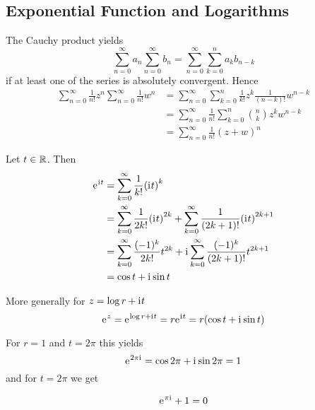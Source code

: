 \subsection{Exponential Function and Logarithms}

\begin{exercise}
The Cauchy product yields
\[
	\sum_{n=0}^\infty a_n \sum_{n=0}^\infty b_n = \sum_{n=0}^\infty \sum_{k=0}^n a_k b_{n-k}
\]  
if at least one of the series is absolutely convergent. Hence
\[
    \begin{split}
		\sum_{n=0}^\infty \frac{1}{n!} z^n \sum_{n=0}^\infty \frac{1}{n!} w^n 
			& = \sum_{n=0}^{\infty} \sum_{k=0}^{n} \frac{1}{k!} z^{k} \frac{1}{(n - k)!} w^{n - k} \\
			& = \sum_{n=0}^{\infty} \frac{1}{n!} \sum_{k=0}^{n} \binom{n}{k} z^{k}w^{n - k} \\
			& = \sum_{n=0}^\infty \frac{1}{n!} {(z + w)}^n	
    \end{split}
\]  
\end{exercise}
\bigskip


Let \( t \in \mathbb{R} \). Then
\[
    \begin{split}
		\mathrm{e}\mkern1mu^{\mathrm{i}\mkern1mu t}
			& = \sum_{k=0}^\infty \frac{1}{k!} {(\mathrm{i}\mkern1mu t)}^k \\
			& = \sum_{k=0}^\infty \frac{1}{2k!} {(\mathrm{i}\mkern1mu t)}^{2k} + 
				\sum_{k=0}^\infty \frac{1}{(2k + 1)!} {(\mathrm{i}\mkern1mu t)}^{2k + 1} \\
			& = \sum_{k=0}^\infty \frac{(-1)^k}{2k!} t^{2k} + 
				\mathrm{i}\mkern1mu\sum_{k=0}^\infty \frac{(-1)^k}{(2k + 1)!} t^{2k + 1} \\
			& = \cos{t} + \mathrm{i}\mkern1mu\sin{t}
    \end{split}
\]

More generally for \( z = \log r + \mathrm{i}\mkern1mu t\)
\[
	\mathrm{e}\mkern1mu^z = \mathrm{e}\mkern1mu^{\log r + \mathrm{i}\mkern1mu t} = r\mathrm{e}\mkern1mu^{\mathrm{i}\mkern1mu t} = r(\cos{t} + \mathrm{i}\mkern1mu\sin{t})
\]

For \( r = 1 \) and \( t = 2\pi \) this yields
\[
	\mathrm{e}\mkern1mu^{2\pi\mathrm{i}\mkern1mu} = \cos{2\pi} + \mathrm{i}\mkern1mu \sin{2\pi} = 1
\]
and for \( t = 2\pi \) we get
\bigskip

\begin{lemma}\label{lemma:lemma_euler_equation}
\[
	\mathrm{e}\mkern1mu^{\pi\mathrm{i}\mkern1mu} + 1 = 0
\]
\end{lemma}
\bigskip


